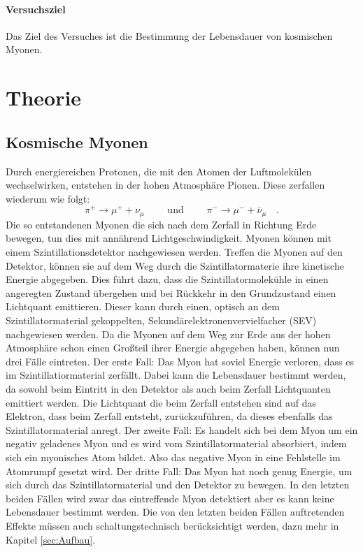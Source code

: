 \paragraph{Versuchsziel}
Das Ziel des Versuches ist die Bestimmung der Lebensdauer von kosmischen Myonen.

\section{Theorie}
\label{sec:Theorie}

\subsection{Kosmische Myonen}
Durch energiereichen Protonen, die mit den Atomen der Luftmolekülen wechselwirken, entstehen in der hohen 
Atmosphäre Pionen. Diese zerfallen wiederum wie folgt:
\begin{equation*} 
\pi^+ \to \mu^+ + \nu_{\mu} \qquad \text{ und } \qquad \pi^- \to \mu^- + \bar{\nu}_{\mu} \quad .
\end{equation*}
Die so entstandenen Myonen die sich nach dem Zerfall in Richtung Erde bewegen, tun dies mit annährend 
Lichtgeschwindigkeit. 
\newline
Myonen können mit einem Szintillationsdetektor nachgewiesen werden. 
Treffen die Myonen auf den Detektor, können sie auf dem  Weg durch die Szintillatormaterie ihre kinetische 
Energie abgegeben. Dies führt dazu, dass die Szintillatormolekühle in einen angeregten Zustand übergehen und bei 
Rückkehr in den Grundzustand einen Lichtquant emittieren. Dieser kann durch einen, optisch an dem 
Szintillatormaterial gekoppelten, Sekundärelektronenvervielfacher (SEV) nachgewiesen werden. Da die Myonen auf dem
Weg zur Erde aus der hohen Atmosphäre schon einen Großteil ihrer Energie abgegeben haben, können nun drei Fälle 
eintreten. Der erste Fall: Das Myon hat soviel Energie verloren, dass es im Szintillatiormaterial zerfällt. Dabei 
kann die Lebensdauer bestimmt werden, da sowohl beim Eintritt in den Detektor als auch beim Zerfall 
Lichtquanten 
emittiert werden. Die Lichtquant die beim Zerfall entstehen sind auf das Elektron, dass beim Zerfall entsteht, 
zurückzuführen, da dieses ebenfalls das Szintillatormaterial anregt. Der zweite Fall: Es handelt sich bei dem 
Myon um ein negativ geladenes Myon und es wird vom Szintillatormaterial absorbiert, indem sich ein 
myonisches Atom bildet. Also das negative Myon in eine Fehlstelle im Atomrumpf gesetzt wird. 
Der dritte Fall: Das 
Myon hat noch genug Energie, um sich durch das 
Szintillatormaterial und den Detektor zu bewegen. In den letzten beiden Fällen wird zwar das eintreffende Myon 
detektiert aber es kann keine Lebensdauer bestimmt werden. Die von den letzten beiden Fällen auftretenden 
Effekte müssen auch schaltungstechnisch berücksichtigt werden, dazu mehr in Kapitel \ref{sec:Aufbau}.
